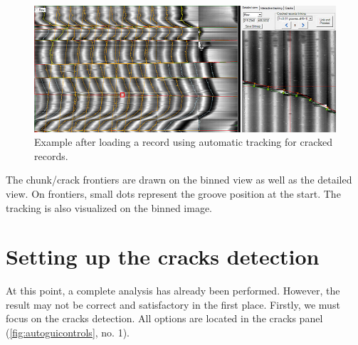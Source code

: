 \begin{figure}[!ht]
\centering
\includegraphics[width=1.0\textwidth]{images/cracks-det-ex}
\caption{Example after loading a record using automatic tracking for cracked records.}
\label{fig:cracksdetex}
\end{figure}

The chunk/crack frontiers are drawn on the binned view as well as the detailed view. On frontiers, small dots represent the groove position at the start. The tracking is also visualized on the binned image.

\section{Setting up the cracks detection}

At this point, a complete analysis has already been performed. However, the result may not be correct and satisfactory in the first place. Firstly, we must focus on the cracks detection. All options are located in the cracks panel (\autoref{fig:autoguicontrols}, no. 1).

